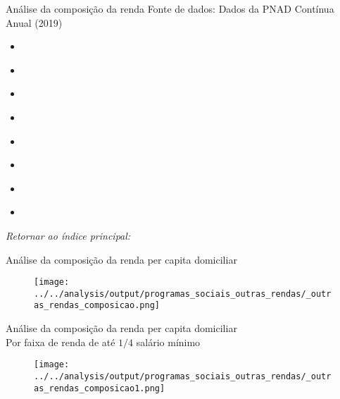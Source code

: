 \begin{frame}[label=_outras_rendas_composicao]{Análise da composição da renda}
{\footnotesize Fonte de dados: Dados da PNAD Contínua Anual (2019)}

\begin{itemize}
\item{
	\hyperlink{_outras_rendas_composicao0}{}
	}
\item{
	\hyperlink{_outras_rendas_composicao1}{}
	} 
\item{
	\hyperlink{_outras_rendas_composicao2}{}
	} 
\item{
	\hyperlink{_outras_rendas_composicao3}{}
	} 
\item{
	\hyperlink{_outras_rendas_composicao3}{}
	} 		
\item{
	\hyperlink{_outras_rendas_composicao3}{}
	} 
\item{
	\hyperlink{_outras_rendas_composicao4}{}
	} 
\item{
	\hyperlink{_outras_rendas_composicao5}{}
	} 

\end{itemize}
\begin{small}
\textit{Retornar ao índice principal: \hyperlink{indice_principal}{} }
\end{small}
\end{frame}


\begin{frame}[label=_outras_rendas_composicao0]{{\small Análise da composição da renda per capita domiciliar}}
\textit{\hyperlink{_outras_rendas_composicao}{}}
\begin{figure}
  \centering
  \texttt{[image: ../../analysis/output/programas\_sociais\_outras\_rendas/\_outras\_rendas\_composicao.png]}
  \caption{}
  \label{fig:_outras_rendas_composicao}
\end{figure}
\end{frame}


\begin{frame}[label=_outras_rendas_composicao1]{{\small Análise da composição da renda per capita domiciliar \\  Por faixa de renda de até $1/4$ salário mínimo}}
\textit{\hyperlink{_outras_rendas_composicao}{}}
\begin{figure}
  \centering
  \texttt{[image: ../../analysis/output/programas\_sociais\_outras\_rendas/\_outras\_rendas\_composicao1.png]}
  \caption{}
  \label{fig:_outras_rendas_composicao1}
\end{figure}
\end{frame}


